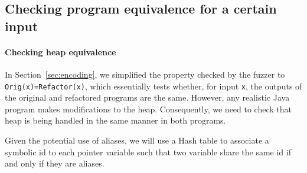 \documentclass[runningheads,a4paper]{llncs}
\begin{document}



\subsection{Checking program equivalence for a certain input}

\paragraph{Checking heap equivalence}

In Section~\ref{sec:encoding}, we simplified the property checked by
the fuzzer to \texttt{Orig(x)=Refactor(x)}, which essentially tests
whether, for input \texttt{x}, the outputs of the original and
refactored programs are the same.  However, any realistic Java program
makes modifications to the heap. Consequently, we need to check that
heap is being handled in the same manner in both programs.

Given the potential use of aliases, we will use a Hash table to
associate a symbolic id to each pointer variable such that two
variable share the same id if and only if they are aliases.
\end{document}
